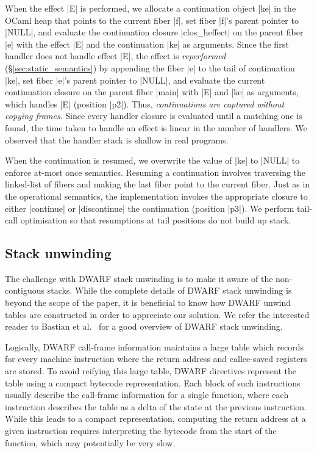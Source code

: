\documentclass[sigplan,screen]{acmart}
\begin{document}
When the effect |E| is performed, we allocate a continuation object |ke| in the
OCaml heap that points to the current fiber |f|, set fiber |f|'s parent pointer
to |NULL|, and evaluate the continuation closure |clos_heffect| on the parent
fiber |e| with the effect |E| and the continuation |ke| as arguments. Since the
first handler does not handle effect |E|, the effect is \emph{reperformed}
(\S\ref{sec:static_semantics}) by appending the fiber |e| to the tail of
continuation |ke|, set fiber |e|'s parent pointer to |NULL|, and evaluate the
current continuation closure on the parent fiber |main| with |E| and |ke| as
arguments, which handles |E| (position |p2|). Thus, \emph{continuations are
captured without copying frames}. Since every handler closure is evaluated
until a matching one is found, the time taken to handle an effect is linear in
the number of handlers. We observed that the handler stack is shallow in real
programs.

When the continuation is resumed, we overwrite the value of |ke| to |NULL| to
enforce at-most once semantics. Resuming a continuation involves traversing the
linked-list of fibers and making the last fiber point to the current fiber.
Just as in the operational semantics, the implementation invokes the
appropriate closure to either |continue| or |discontinue| the continuation
(position |p3|). We perform tail-call optimisation so that resumptions at tail
positions do not build up stack.

\subsection{Stack unwinding}

The challenge with DWARF stack unwinding is to make it aware of the
non-contiguous stacks. While the complete details of DWARF stack unwinding is
beyond the scope of the paper, it is beneficial to know how DWARF unwind tables
are constructed in order to appreciate our solution. We refer the interested
reader to Bastian et al.~\cite{Bastian19} for a good overview of DWARF stack
unwinding.

Logically, DWARF call-frame information maintains a large table which records
for every machine instruction where the return address and callee-saved
registers are stored. To avoid reifying this large table, DWARF directives
represent the table using a compact bytecode representation. Each block of such
instructions usually describe the call-frame information for a single function,
where each instruction describes the table as a delta of the state at the
previous instruction. While this leads to a compact representation, computing
the return address at a given instruction requires interpreting the bytecode
from the start of the function, which may potentially be very slow.
\end{document}
